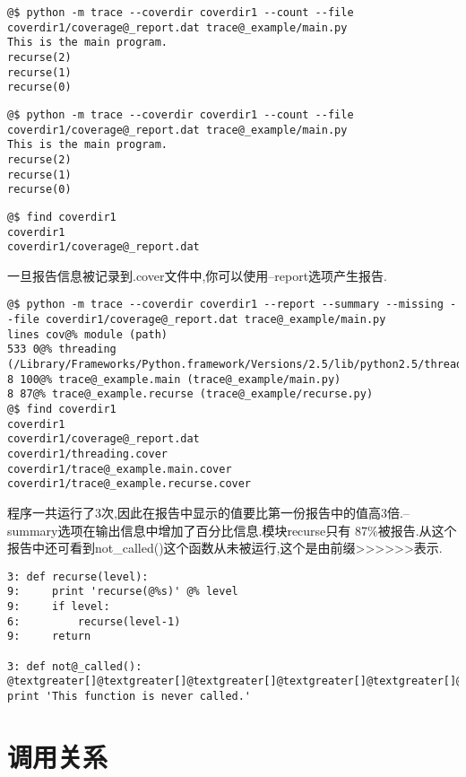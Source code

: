 \documentclass[a4paper,10pt,english]{manual}
\begin{document}
\begin{Verbatim}[commandchars=@\[\]]
@$ python -m trace --coverdir coverdir1 --count --file coverdir1/coverage@_report.dat trace@_example/main.py
This is the main program.
recurse(2)
recurse(1)
recurse(0)
\end{Verbatim}

\begin{Verbatim}[commandchars=@\[\]]
@$ python -m trace --coverdir coverdir1 --count --file coverdir1/coverage@_report.dat trace@_example/main.py
This is the main program.
recurse(2)
recurse(1)
recurse(0)
\end{Verbatim}

\begin{Verbatim}[commandchars=@\[\]]
@$ find coverdir1
coverdir1
coverdir1/coverage@_report.dat
\end{Verbatim}

一旦报告信息被记录到.cover文件中,你可以使用--report选项产生报告.

\begin{Verbatim}[commandchars=@\[\]]
@$ python -m trace --coverdir coverdir1 --report --summary --missing --file coverdir1/coverage@_report.dat trace@_example/main.py
lines cov@% module (path)
533 0@% threading (/Library/Frameworks/Python.framework/Versions/2.5/lib/python2.5/threading.py)
8 100@% trace@_example.main (trace@_example/main.py)
8 87@% trace@_example.recurse (trace@_example/recurse.py)
@$ find coverdir1
coverdir1
coverdir1/coverage@_report.dat
coverdir1/threading.cover
coverdir1/trace@_example.main.cover
coverdir1/trace@_example.recurse.cover
\end{Verbatim}

程序一共运行了3次,因此在报告中显示的值要比第一份报告中的值高3倍.--summary选项在输出信息中增加了百分比信息.模块recurse只有 87\%被报告.从这个报告中还可看到not\_called()这个函数从未被运行,这个是由前缀\textgreater{}\textgreater{}\textgreater{}\textgreater{}\textgreater{}\textgreater{}表示.

\begin{Verbatim}[commandchars=@\[\]]
3: def recurse(level):
9:     print 'recurse(@%s)' @% level
9:     if level:
6:         recurse(level-1)
9:     return

3: def not@_called():
@textgreater[]@textgreater[]@textgreater[]@textgreater[]@textgreater[]@textgreater[] print 'This function is never called.'
\end{Verbatim}


\section{调用关系}
\end{document}
